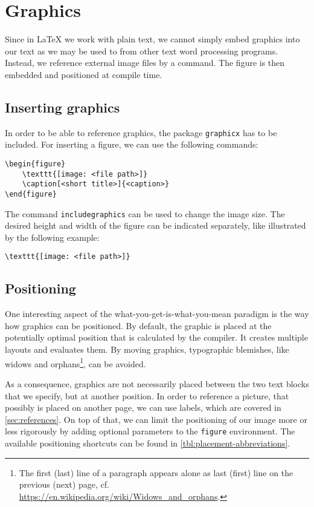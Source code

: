 \chapter{Graphics}
\label{sec:graphics}

Since in \LaTeX{} we work with plain text, we cannot simply embed graphics into our text as we may be used to from other text word processing programs. 
Instead, we reference external image files by a command. The figure is then embedded and positioned at compile time.

\section{Inserting graphics}
\label{sec:display-graphics}
In order to be able to reference graphics, the package \texttt{graphicx} has to be included. For inserting a figure, we can use the following commands:
	
\begin{verbatim}
\begin{figure}
	\texttt{[image: <file path>]}
	\caption[<short title>]{<caption>}
\end{figure}
\end{verbatim}

\noindent The command \texttt{includegraphics} can be used to change the image size. The desired height and width of the figure can be indicated separately, like illustrated by the following example:

\begin{verbatim}
\texttt{[image: <file path>]}
\end{verbatim}

\section{Positioning}
\label{sec:graphics-placement}
One interesting aspect of the  what-you-get-is-what-you-mean paradigm is the way how graphics can be positioned. 
By default, the graphic is placed at the potentially optimal position that is calculated by the compiler. It creates multiple layouts and evaluates them. By moving graphics, typographic blemishes, like widows and orphans\footnote{The first (last) line of a paragraph appears alone as last (first) line on the previous (next) page, cf. \url{https://en.wikipedia.org/wiki/Widows_and_orphans}.}, can be avoided. 

As a consequence, graphics are not necessarily placed between the two text blocks that we specify, but at another position. 
In order to reference a picture, that possibly is placed on another page, we can use labels, which are covered in \cref{sec:references}. 
On top of that, we can limit the positioning of our image more or less rigorously by adding optional parameters to the \texttt{figure} environment. The available positioning shortcuts can be found in \cref{tbl:placement-abbreviations}.


